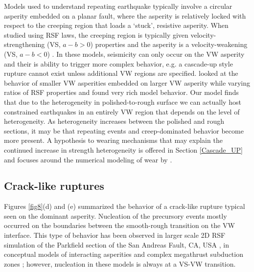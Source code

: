 \documentclass[preprint,1p, 10pt,authoryear]{elsarticle}
\begin{document}
Models used to understand repeating earthquake typically involve a circular asperity embedded on a planar fault, where the asperity is relatively locked with respect to the creeping region that loads a `stuck', resistive asperity. When studied using RSF laws, the creeping region is typically given velocity-strengthening (VS, $a-b>0$) properties and the asperity is a velocity-weakening  (VS, $a-b<0$) \citep{Kato2003,Chen2009}. In these models, seismicity can only occur on the VW asperity and their is ability to trigger more complex behavior, e.g. a cascade-up style rupture cannot exist unless additional VW regions are specified. \citet{Noda2013} looked at the behavior of smaller VW asperities embedded on larger VW asperity while varying ratios of RSF properties and found very rich model behavior. Our model finds that due to the heterogeneity in polished-to-rough surface we can actually host constrained earthquakes in an entirely VW region that depends on the level of heterogeneity.  As heterogeneity increases between the polished and rough sections, it may be that repeating events and creep-dominated behavior become more present.  A hypothesis to wearing mechanisms that may explain the continued increase in strength heterogeneity is offered in Section \ref{Cascade_UP} and focuses around the numerical modeling of wear by \citet{Aghababaei2016}.

\subsection{Crack-like ruptures}
Figures \ref{fig8}(d) and  (e) summarized the behavior of a crack-like rupture typical seen on the dominant asperity. Nucleation of the precursory events mostly occurred on the boundaries between the smooth-rough transition on the VW interface. This type of behavior has been observed in larger scale 2D RSF simulation of the Parkfield section of the San Andreas Fault, CA, USA \citep{Barbot2012}, in conceptual models of interacting asperities \citep{Kato2003} and complex megathrust subduction zones \citep{Kaneko2010}; however, nucleation in these models is always at a VS-VW transition. 
\end{document}
